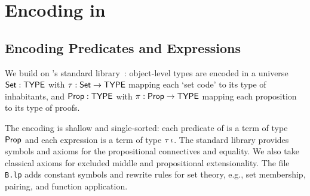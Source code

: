 \section{Encoding \pp{} in \lp}\label{sec:encoding}

\subsection{Encoding Predicates and Expressions}\label{sec:enc-formulas}

We build on \lp's standard library~\cite{Blanqui2021}: object-level types are
encoded in a universe $\mathsf{Set} : \mathsf{TYPE}$ with $\tau : \mathsf{Set} \to \mathsf{TYPE}$ mapping each
`set code' to its type of inhabitants, and $\mathsf{Prop} : \mathsf{TYPE}$ with
$\pi : \mathsf{Prop} \to \mathsf{TYPE}$ mapping each proposition to its type of proofs.

The encoding is shallow and single-sorted: each predicate of \pp{} is a term of
type $\mathsf{Prop}$ and each expression is a term of type $\tau\,\iota$.
%
The standard library provides symbols and axioms for the propositional
connectives and equality.
%
We also take classical axioms for excluded middle and
propositional extensionality.
%
The file \texttt{B.lp} adds constant symbols and rewrite rules for set theory,
e.g., set membership, pairing, and function application.

